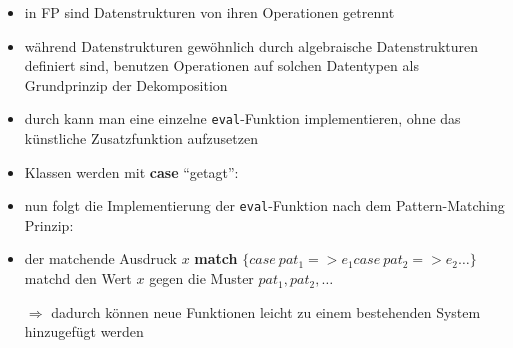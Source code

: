 

\begin{itemize}
  \item in FP sind Datenstrukturen von ihren Operationen getrennt  
  \item während Datenstrukturen gewöhnlich durch algebraische Datenstrukturen
  definiert sind, benutzen Operationen auf solchen Datentypen 
   als Grundprinzip der Dekomposition
  \item durch  kann man eine einzelne 
  \texttt{eval}-Funktion implementieren, ohne das künstliche Zusatzfunktion
  aufzusetzen
  \item Klassen werden mit \textbf{case} \enquote{getagt}:
  
  
  \item nun folgt die Implementierung der \texttt{eval}-Funktion nach dem
  Pattern-Matching Prinzip:
  
  
  
  \item der matchende Ausdruck $x$ \textbf{match} $\{ case\: pat_1 => e_1
  case\: pat_2 => e_2 \ldots \}$ matchd den Wert $x$ gegen die Muster $pat_1, 
  pat_2, \ldots$
  
  
  $\Rightarrow$ dadurch können neue Funktionen leicht zu einem bestehenden
  System hinzugefügt werden
\end{itemize}


